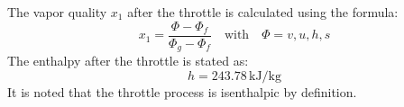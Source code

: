 The vapor quality \(x_1\) after the throttle is calculated using the formula:  
\[
x_1 = \frac{\Phi - \Phi_f}{\Phi_g - \Phi_f} \quad \text{with} \quad \Phi = v, u, h, s
\]  
The enthalpy after the throttle is stated as:  
\[
h = 243.78 \, \text{kJ/kg}
\]  
It is noted that the throttle process is isenthalpic by definition.